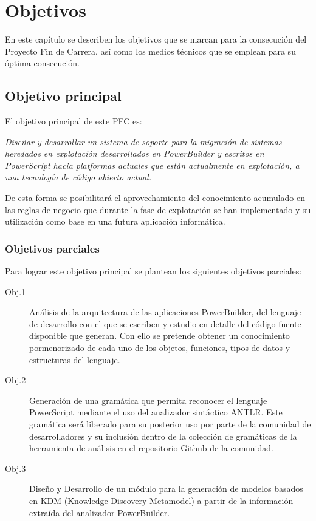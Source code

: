 \chapter{Objetivos}
\label{chap:objetivos}

En este capítulo se describen los objetivos que se marcan para la consecución del
Proyecto Fin de Carrera, así como los medios técnicos que se emplean para su óptima
consecución.

\section{Objetivo principal} \label{sec:objetivo-principal}

El objetivo principal de este PFC es:

\emph{Diseñar y desarrollar un sistema de soporte para la migración de sistemas heredados en explotación
desarrollados en PowerBuilder y escritos en PowerScript hacia platformas actuales que están actualmente
en explotación, a una tecnología de código abierto actual.}

De esta forma se posibilitará el aprovechamiento 
del conocimiento acumulado en las reglas de negocio que durante la fase de explotación se han implementado y 
su utilización como base en una futura aplicación informática. 

\subsection{Objetivos parciales}\label{sec:objetivos-parciales}
Para lograr este objetivo principal se plantean los siguientes objetivos parciales:
\begin{description}

\item[Obj.1] Análisis de la arquitectura de las aplicaciones PowerBuilder, del lenguaje de desarrollo con el que se escriben 
y estudio en detalle del código fuente disponible que generan. Con ello se pretende obtener un conocimiento pormenorizado de cada uno de los
objetos, funciones, tipos de datos y estructuras del lenguaje. 

\item[Obj.2] Generación de una gramática que permita reconocer el lenguaje PowerScript mediante el uso del analizador
sintáctico ANTLR. Este gramática será liberado para su posterior uso por parte de la comunidad de desarrolladores y su 
inclusión dentro de la colección de gramáticas de la herramienta de análisis en el repositorio Github de la comunidad.

\item[Obj.3] Diseño y Desarrollo de un módulo para la generación de modelos basados en KDM (Knowledge-Discovery Metamodel)\cite{KDM}
a partir de la información extraída del analizador PowerBuilder.


\end{description}

